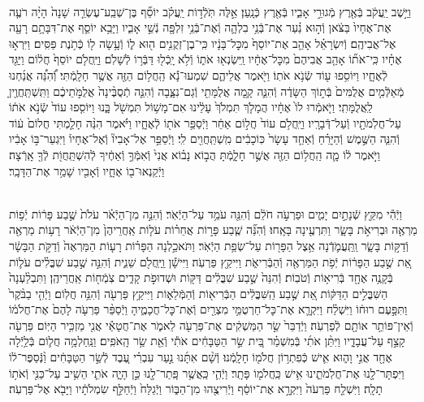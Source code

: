 \documentclass[twoside, openany, parskip=half, 11pt]{book}
\begin{document}
\begin{footnotesize}
\begin{multicols}{2}
\\
וַיֵּ֣שֶׁב יַֽעֲקֹ֔ב בְּֿאֶ֖רֶץ מְֿגוּרֵ֣י אָבִ֑יו בְּֿאֶ֖רֶץ כְּֿנָֽעַן׃ אֵ֣לֶּה תֹּֽלְֿד֣וֹת יַֽעֲקֹ֗ב יוֹסֵ֞ף בֶּן־שְׁבַֽע־עֶשְׂרֵ֤ה שָׁנָה֙ הָיָ֨ה רֹעֶ֤ה אֶת־אֶחָיו֙ בַּצֹּ֔אן וְֿה֣וּא נַ֗עַר אֶת־בְּֿנֵ֥י בִלְהָ֛ה וְֿאֶת־בְּֿנֵ֥י זִלְפָּ֖ה נְֿשֵׁ֣י אָבִ֑יו וַיָּבֵ֥א יוֹסֵ֛ף אֶת־דִּבָּתָ֥ם רָעָ֖ה אֶל־אֲבִיהֶֽם׃ וְֿיִשְׂרָאֵ֗ל אָהַ֤ב אֶת־יוֹסֵף֙ מִכׇּל־בָּנָ֔יו כִּֽי־בֶן־זְקֻנִ֥ים ה֖וּא ל֑וֹ וְֿעָ֥שָׂה ל֖וֹ כְּֿתֹ֥נֶת פַּסִּֽים׃  וַיִּרְא֣וּ אֶחָ֗יו כִּֽי־אֹת֞וֹ אָהַ֤ב אֲבִיהֶם֙ מִכׇּל־אֶחָ֔יו וַֽיִּשְׂנְא֖וּ אֹת֑וֹ וְֿלֹ֥א יָֽכְֿל֖וּ דַּבְּֿר֥וֹ לְֿשָׁלֹֽם׃ וַיַּֽחֲלֹ֤ם יוֹסֵף֙ חֲל֔וֹם וַיַּגֵּ֖ד לְֿאֶחָ֑יו וַיּוֹסִ֥פוּ ע֖וֹד שְֿׂנֹ֥א אֹתֽוֹ׃ וַיֹּ֖אמֶר אֲלֵיהֶ֑ם שִׁמְעוּ־נָ֕א הַֽחֲל֥וֹם הַזֶּ֖ה אֲשֶׁ֥ר חָלָֽמְֿתִּי׃ וְֿ֠הִנֵּ֠ה אֲנַ֜חְנוּ מְֿאַלְּֿמִ֤ים אֲלֻמִּים֙ בְּֿת֣וֹךְ הַשָּׂדֶ֔ה וְֿהִנֵּ֛ה קָ֥מָה אֲלֻמָּתִ֖י וְֿגַם־נִצָּ֑בָה וְֿהִנֵּ֤ה תְֿסֻבֶּ֨ינָה֙ אֲלֻמֹּ֣תֵיכֶ֔ם וַתִּֽשְׁתַּֽחֲוֶ֖יןָ לַֽאֲלֻמָּתִֽי׃  וַיֹּ֤אמְֿרוּ לוֹ֙ אֶחָ֔יו הֲמָלֹ֤ךְ תִּמְלֹךְ֙ עָלֵ֔ינוּ אִם־מָשׁ֥וֹל תִּמְשֹׁ֖ל בָּ֑נוּ וַיּוֹסִ֤פוּ עוֹד֙ שְֿׂנֹ֣א אֹת֔וֹ עַל־חֲלֹֽמֹתָ֖יו וְֿעַל־דְּֿבָרָֽיו׃ וַיַּֽחֲלֹ֥ם עוֹד֙ חֲל֣וֹם אַחֵ֔ר וַיְֿסַפֵּ֥ר אֹת֖וֹ לְֿאֶחָ֑יו וַיֹּ֗אמֶר הִנֵּ֨ה חָלַ֤מְתִּי חֲלוֹם֙ ע֔וֹד וְֿהִנֵּ֧ה הַשֶּׁ֣מֶשׁ וְֿהַיָּרֵ֗חַ וְֿאַחַ֤ד עָשָׂר֙ כּֽוֹכָבִ֔ים מִֽשְׁתַּֽחֲוִ֖ים לִֽי׃ וַיְֿסַפֵּ֣ר אֶל־אָבִיו֘ וְֿאֶל־אֶחָיו֒ וַיִּגְעַר־בּ֣וֹ אָבִ֔יו וַיֹּ֣אמֶר ל֔וֹ מָ֛ה הַֽחֲל֥וֹם הַזֶּ֖ה אֲשֶׁ֣ר חָלָ֑מְֿתָּ הֲב֣וֹא נָב֗וֹא אֲנִי֙ וְֿאִמְּֿךָ֣ וְֿאַחֶ֔יךָ לְֿהִשְׁתַּֽחֲוֹ֖ת לְֿךָ֖ אָֽרְֿצָה׃ וַיְֿקַנְאוּ־ב֖וֹ אֶחָ֑יו וְֿאָבִ֖יו שָׁמַ֥ר אֶת־הַדָּבָֽר׃

\\
וַיְֿהִ֕י מִקֵּ֖ץ שְֿׁנָתַ֣יִם יָמִ֑ים וּפַרְעֹ֣ה חֹלֵ֔ם וְֿהִנֵּ֖ה עֹמֵ֥ד עַל־הַיְֿאֹֽר׃ וְֿהִנֵּ֣ה מִן־הַיְֿאֹ֗ר עֹלֹת֙ שֶׁ֣בַע פָּר֔וֹת יְֿפ֥וֹת מַרְאֶ֖ה וּבְרִיאֹ֣ת בָּשָׂ֑ר וַתִּרְעֶ֖ינָה בָּאָֽחוּ׃ וְֿהִנֵּ֞ה שֶׁ֧בַע פָּר֣וֹת אֲחֵר֗וֹת עֹל֤וֹת אַֽחֲרֵיהֶן֙ מִן־הַיְֿאֹ֔ר רָע֥וֹת מַרְאֶ֖ה וְֿדַקּ֣וֹת בָּשָׂ֑ר וַֽתַּֽעֲמֹ֛דְֿנָה אֵ֥צֶל הַפָּר֖וֹת עַל־שְׂפַ֥ת הַיְֿאֹֽר׃ וַתֹּאכַ֣לְנָה הַפָּר֗וֹת רָע֤וֹת הַמַּרְאֶה֙ וְֿדַקֹּ֣ת הַבָּשָׂ֔ר אֵ֚ת שֶׁ֣בַע הַפָּר֔וֹת יְֿפֹ֥ת הַמַּרְאֶ֖ה וְֿהַבְּֿרִיאֹ֑ת וַיִּיקַ֖ץ פַּרְעֹֽה׃  וַיִּישָׁ֕ן וַֽיַּֽחֲלֹ֖ם שֵׁנִ֑ית וְֿהִנֵּ֣ה שֶׁ֣בַע שִׁבֳּלִ֗ים עֹל֛וֹת בְּֿקָנֶ֥ה אֶחָ֖ד בְּֿרִיא֥וֹת וְֿטֹבֽוֹת׃ וְֿהִנֵּה֙ שֶׁ֣בַע שִׁבֳּלִ֔ים דַּקּ֖וֹת וּשְׁדוּפֹ֣ת קָדִ֑ים צֹֽמְֿח֖וֹת אַֽחֲרֵיהֶֽן׃ וַתִּבְלַ֨עְנָה֙ הַשִּׁבֳּלִ֣ים הַדַּקּ֔וֹת אֵ֚ת שֶׁ֣בַע הַֽשִּׁבֳּלִ֔ים הַבְּֿרִיא֖וֹת וְֿהַמְּֿלֵא֑וֹת וַיִּיקַ֥ץ פַּרְעֹ֖ה וְֿהִנֵּ֥ה חֲלֽוֹם׃  וַיְֿהִ֤י בַבֹּ֨קֶר֙ וַתִּפָּ֣עֶם רוּח֔וֹ וַיִּשְׁלַ֗ח וַיִּקְרָ֛א אֶת־כׇּל־חַרְטֻמֵּ֥י מִצְרַ֖יִם וְֿאֶת־כׇּל־חֲכָמֶ֑יהָ וַיְֿסַפֵּ֨ר פַּרְעֹ֤ה לָהֶם֙ אֶת־חֲלֹמ֔וֹ וְֿאֵין־פּוֹתֵ֥ר אוֹתָ֖ם לְֿפַרְעֹֽה׃ וַיְֿדַבֵּר֙ שַׂ֣ר הַמַּשְׁקִ֔ים אֶת־פַּרְעֹ֖ה לֵאמֹ֑ר אֶת־חֲטָאַ֕י אֲנִ֖י מַזְכִּ֥יר הַיּֽוֹם׃ פַּרְעֹ֖ה קָצַ֣ף עַל־עֲבָדָ֑יו וַיִּתֵּ֨ן אֹתִ֜י בְּֿמִשְׁמַ֗ר בֵּ֚ית שַׂ֣ר הַטַּבָּחִ֔ים אֹתִ֕י וְֿאֵ֖ת שַׂ֥ר הָֽאֹפִֽים׃ וַנַּֽחַלְמָ֥ה חֲל֛וֹם בְּֿלַ֥יְֿלָה אֶחָ֖ד אֲנִ֣י וָה֑וּא אִ֛ישׁ כְּֿפִתְר֥וֹן חֲלֹמ֖וֹ חָלָֽמְֿנוּ׃ וְֿשָׁ֨ם אִתָּ֜נוּ נַ֣עַר עִבְרִ֗י עֶ֚בֶד לְֿשַׂ֣ר הַטַּבָּחִ֔ים וַ֨נְּֿסַפֶּר־ל֔וֹ וַיִּפְתָּר־לָ֖נוּ אֶת־חֲלֹֽמֹתֵ֑ינוּ אִ֥ישׁ כַּֽחֲלֹמ֖וֹ פָּתָֽר׃ וַיְֿהִ֛י כַּֽאֲשֶׁ֥ר פָּֽתַר־לָ֖נוּ כֵּ֣ן הָיָ֑ה אֹתִ֛י הֵשִׁ֥יב עַל־כַּנִּ֖י וְֿאֹת֥וֹ תָלָֽה׃ וַיִּשְׁלַ֤ח פַּרְעֹה֙ וַיִּקְרָ֣א אֶת־יוֹסֵ֔ף וַיְֿרִיצֻ֖הוּ מִן־הַבּ֑וֹר וַיְֿגַלַּח֙ וַיְֿחַלֵּ֣ף שִׂמְלֹתָ֔יו וַיָּבֹ֖א אֶל־פַּרְעֹֽה׃


\end{multicols}
\end{footnotesize}
\end{document}
